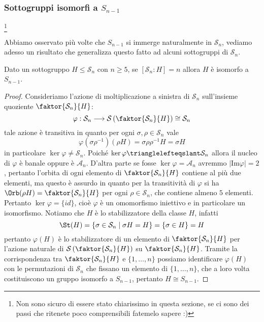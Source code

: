 \documentclass[11pt]{scrartcl}
\begin{document}
\subsubsection{Sottogruppi isomorfi a $S_{n - 1}$}\footnote{
    Non sono sicuro di essere stato chiarissimo in questa sezione, se ci 
    sono dei passi che ritenete poco comprensibili fatemelo sapere :)
}

Abbiamo osservato più volte che $S_{n - 1}$ si immerge naturalmente in $\mathcal{S}_n$,
vediamo adesso un risultato che generalizza questo fatto ad alcuni sottogruppi di 
$\mathcal{S}_n$.

\begin{proposition}
    \label{prop1.68}
    Dato un sottogruppo $H\leqslant \mathcal{S}_n$ con $n \geq 5$, se $[\mathcal{S}_n : H] = n$ allora $H$ è 
    isomorfo a $S_{n - 1}$.
\end{proposition}

\begin{proof}
    Consideriamo l'azione di moltiplicazione a sinistra di $\mathcal{S}_n$ sull'insieme
    quoziente $\faktor{\mathcal{S}_n}{H}$:
    \[
        \varphi: \mathcal{S}_n\longrightarrow\mathcal{S}\left(\faktor{\mathcal{S}_n}{H}\right) \cong \mathcal{S}_n
    \]
    tale azione è transitiva in quanto per ogni $\sigma, \rho \in \mathcal{S}_n$ vale
    \[
        \varphi(\sigma\rho^{-1})(\rho H) = \sigma \rho\rho^{-1}H = \sigma H
    \]
    in particolare $\ker \varphi \neq \mathcal{S}_n$. Poiché $\ker\varphi \trianglelefteqslant \mathcal{S}_n$
    allora il nucleo di $\varphi$ è banale oppure è $\mathcal{A}_n$. D'altra 
    parte se fosse $\ker \varphi = \mathcal{A}_n$ avremmo $|\mathrm{Im}\varphi| = 2$,
    pertanto l'orbita di ogni elemento di $\faktor{\mathcal{S}_n}{H}$ contiene al più 
    due elementi, ma questo è assurdo in quanto per la transitività di $\varphi$
    si ha $\Orb(\rho H) = \faktor{\mathcal{S}_n}{H}$ per ogni $\rho \in \mathcal{S}_n$, che contiene almeno $5$ elementi.
    Pertanto $\ker\varphi = \{id\}$, cioè $\varphi$ è un omomorfismo iniettivo e
    in particolare un isomorfismo.
    Notiamo che $H$ è lo stabilizzatore della classe $H$, infatti
    \[
        \St(H) = \{\sigma \in \mathcal{S}_n \mid \sigma H = H\} = \{\sigma \in H\} = H
    \]
    pertanto $\varphi(H)$ è lo stabilizzatore di un elemento di $\faktor{\mathcal{S}_n}{H}$
    per l'azione naturale di $\mathcal{S}\left(\faktor{\mathcal{S}_n}{H}\right)$ su $\faktor{\mathcal{S}_n}{H}$.
    Tramite la corrispondenza tra $\faktor{\mathcal{S}_n}{H}$ e $\{1, \ldots, n\}$
    possiamo identificare $\varphi(H)$ con le permutazioni di $\mathcal{S}_n$ che fissano
    un elemento di $\{1, \ldots, n\}$, che a loro volta costituiscono un 
    gruppo isomorfo a $S_{n - 1}$, pertanto $H \cong S_{n - 1}$.
\end{proof}
\end{document}
